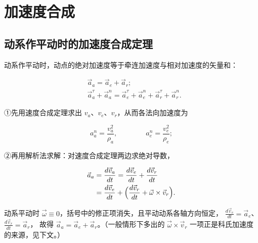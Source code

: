 \section{加速度合成}

\subsection{动系作平动时的加速度合成定理}

\begin{theorem}[动系平动时的加速度合成定理]\label{thm:8-atrans}
动系作平动时，动点的绝对加速度等于牵连加速度与相对加速度的矢量和：

\begin{equation}\label{eq:8-atrans}
\begin{aligned}
  &\vec a_a = \vec a_e + \vec a_r ;\\
  &\vec a_a^{\tau} + \vec a_a^{n}
    = \vec a_e^{\tau} + \vec a_e^{n} + \vec a_r^{\tau} + \vec a_r^{n} .
\end{aligned}
\end{equation}
\end{theorem}

①先用速度合成定理求出 $v_a$、$v_e$、$v_r$，从而各法向加速度为

\begin{equation}\label{eq:8-anorm}
  a_a^{n} = \frac{v_a^2}{\rho_a},
  \qquad\qquad
  a_e^{n} = \frac{v_e^2}{\rho_e} ;
\end{equation}

②再用解析法求解：对速度合成定理两边求绝对导数，

\begin{equation}\label{eq:8-a-chain}
\begin{aligned}
  \vec a_a &= \frac{d\vec v_a}{dt}
            = \frac{d\vec v_e}{dt} + \frac{d\vec v_r}{dt}\\
           &= \frac{d\vec v_e}{dt}
            + \Bigl(\frac{d\vec v_r}{dt} + \vec\omega\times\vec v_r\Bigr) .
\end{aligned}
\end{equation}

动系平动时 $\vec\omega \equiv 0$，括号中的修正项消失，且平动动系各轴方向恒定，
$\frac{d\vec v_e}{dt} = \vec a_e$、$\frac{d\vec v_r}{dt} = \vec a_r$，
故得 $\vec a_a = \vec a_e + \vec a_r$。（一般情形下多出的 $\vec\omega\times\vec v_r$
一项正是科氏加速度的来源，见下文。）

